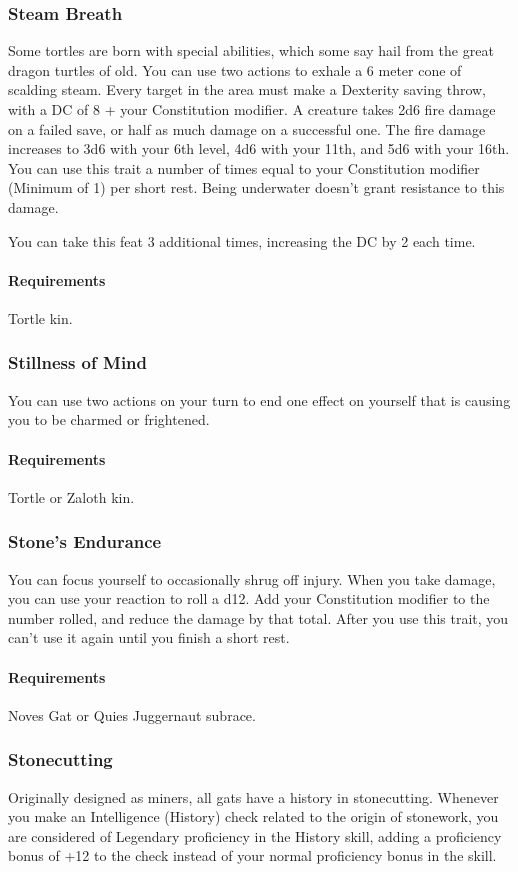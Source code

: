 \subsubsection{Steam Breath} \label{feat::steambreath}
    Some tortles are born with special abilities, which some say hail from the great dragon turtles of old.
    You can use two actions to exhale a 6 meter cone of scalding steam.
    Every target in the area must make a Dexterity saving throw, with a DC of 8 + your Constitution modifier.
    A creature takes 2d6 fire damage on a failed save, or half as much damage on a successful one.
    The fire damage increases to 3d6 with your 6th level, 4d6 with your 11th, and 5d6 with your 16th.
    You can use this trait a number of times equal to your Constitution modifier (Minimum of 1) per short rest.
    Being underwater doesn't grant resistance to this damage.

    You can take this feat 3 additional times, increasing the DC by 2 each time.
    \paragraph{Requirements} Tortle kin.
\subsubsection{Stillness of Mind} \label{feat::stillnessofmind}
    You can use two actions on your turn to end one effect on yourself that is causing you to be charmed or frightened.
    \paragraph{Requirements} Tortle or Zaloth kin.
\subsubsection{Stone's Endurance} \label{feat::stonesendurance}
    You can focus yourself to occasionally shrug off injury.
    When you take damage, you can use your reaction to roll a d12.
    Add your Constitution modifier to the number rolled, and reduce the damage by that total.
    After you use this trait, you can't use it again until you finish a short rest.
    \paragraph{Requirements} Noves Gat or Quies Juggernaut subrace.
\subsubsection{Stonecutting} \label{feat::stonecutting}
    Originally designed as miners, all gats have a history in stonecutting.
    Whenever you make an Intelligence (History) check related to the origin of stonework, you are considered of Legendary proficiency in the History skill, adding a proficiency bonus of +12 to the check instead of your normal proficiency bonus in the skill.
